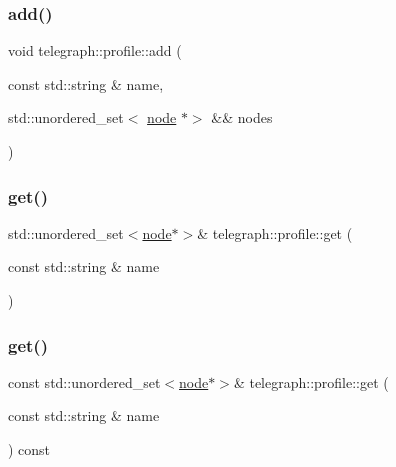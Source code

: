 \mbox{\label{classtelegraph_1_1profile_a8855f4f0091aae625de7c5eae4f548bf}} 
\subsubsection{\texorpdfstring{add()}{add()}\hspace{0.1cm}{\footnotesize\ttfamily [2/2]}}
{\footnotesize\ttfamily void telegraph\+::profile\+::add (\begin{DoxyParamCaption}\item[{const std\+::string \&}]{name,  }\item[{std\+::unordered\+\_\+set$<$ \hyperlink{classtelegraph_1_1node}{node} $\ast$$>$ \&\&}]{nodes }\end{DoxyParamCaption})\hspace{0.3cm}{\ttfamily [inline]}}

\mbox{\label{classtelegraph_1_1profile_ae55ca8f3458bc9a7b29b94320e11a075}} 
\subsubsection{\texorpdfstring{get()}{get()}\hspace{0.1cm}{\footnotesize\ttfamily [1/2]}}
{\footnotesize\ttfamily std\+::unordered\+\_\+set$<$\hyperlink{classtelegraph_1_1node}{node}$\ast$$>$\& telegraph\+::profile\+::get (\begin{DoxyParamCaption}\item[{const std\+::string \&}]{name }\end{DoxyParamCaption})\hspace{0.3cm}{\ttfamily [inline]}}

\mbox{\label{classtelegraph_1_1profile_ae815f4b8ed9bbde85fbccc48b730fadd}} 
\subsubsection{\texorpdfstring{get()}{get()}\hspace{0.1cm}{\footnotesize\ttfamily [2/2]}}
{\footnotesize\ttfamily const std\+::unordered\+\_\+set$<$\hyperlink{classtelegraph_1_1node}{node}$\ast$$>$\& telegraph\+::profile\+::get (\begin{DoxyParamCaption}\item[{const std\+::string \&}]{name }\end{DoxyParamCaption}) const\hspace{0.3cm}{\ttfamily [inline]}}

